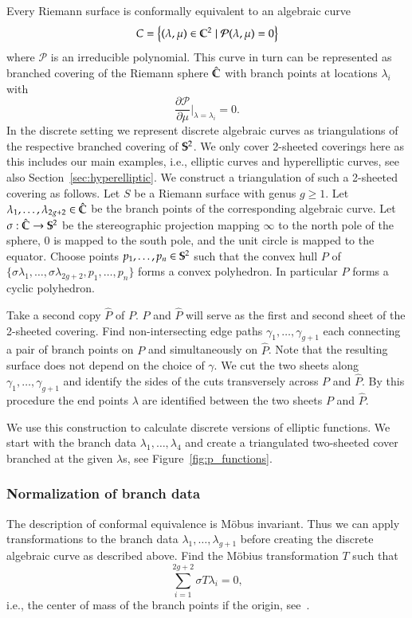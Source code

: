 \documentclass[Thesis.tex]{subfiles}
\begin{document}
  Every Riemann surface is conformally equivalent to an algebraic curve
  \[C=\left\{(\lambda,\mu)\in \C^2 \mid \mathcal P(\lambda,\mu)=0\right\}\]
  where $\mathcal P$ is an irreducible polynomial.
  This curve in turn can be represented as branched covering of the Riemann sphere $\hat{\C}$ with branch points at locations $\lambda_i$ with \[\frac{\partial\mathcal P}{\partial \mu}\Bigr|_{\lambda=\lambda_i} = 0.\]
  In the discrete setting we represent discrete algebraic curves as triangulations of the respective branched covering of $\S^2$.
  We only cover 2-sheeted coverings here as this includes our main examples, i.e., elliptic curves and hyperelliptic curves, see also Section~\ref{sec:hyperelliptic}.
  We construct a triangulation of such a 2-sheeted covering as follows.
  Let $S$ be a Riemann surface with genus $g\geq 1$.
  Let $\lambda_1,\ldots,\lambda_{2g+2}\in \hat\C$ be the branch points of the corresponding algebraic curve.
  Let $\sigma :\hat\C\to\S^2$ be the stereographic projection mapping $\infty$ to the north pole of the sphere, $0$ is mapped to the south pole, and the unit circle is mapped to the equator.
  Choose points $p_1,\ldots,p_n\in\S^2$ such that the convex hull $P$ of $\{\sigma\lambda_1,\ldots,\sigma\lambda_{2g+2},p_1,\ldots,p_n\}$ forms a convex polyhedron.
  In particular $P$ forms a cyclic polyhedron.

  Take a second copy $\hat P$ of $P$. $P$ and $\hat P$ will serve as the first and second sheet of the 2-sheeted covering.
  Find non-intersecting edge paths $\gamma_1,\ldots,\gamma_{g+1}$ each connecting a pair of branch points on $P$ and simultaneously on $\hat P$.
  Note that the resulting surface does not depend on the choice of $\gamma$.
  We cut the two sheets along $\gamma_1,\ldots,\gamma_{g+1}$ and identify the sides of the cuts transversely across $P$ and $\hat P$.
  By this procedure the end points $\lambda$ are identified between the two sheets $P$ and $\hat P$.

  We use this construction to calculate discrete versions of elliptic functions.
  We start with the branch data $\lambda_1,\ldots,\lambda_{4}$ and create a triangulated two-sheeted cover branched at the given $\lambda$s, see Figure~\ref{fig:p_functions}.

  \subsubsection{Normalization of branch data}
  The description of conformal equivalence is M{\"o}bus invariant. Thus we can apply transformations to the branch data $\lambda_1,\ldots,\lambda_{g+1}$ before creating the discrete algebraic curve as described above. Find the M{\"o}bius transformation $T$ such that
  \[\sum_{i=1}^{2g+2}\sigma T \lambda_i = 0,\]
  i.e., the center of mass of the branch points if the origin, see~\cite{Springborn05}.
\end{document}
